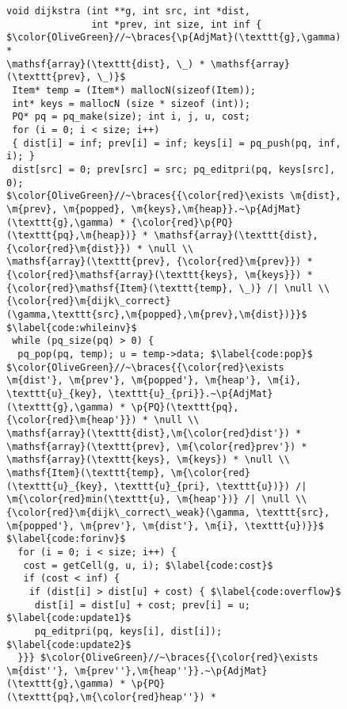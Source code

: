 
\begin{figure}[t]

\begin{lstlisting}[mathescape=true,showlines=true]
void dijkstra (int **g, int src, int *dist, 
               int *prev, int size, int inf {
$\color{OliveGreen}//~\braces{\p{AdjMat}(\texttt{g},\gamma) *
\mathsf{array}(\texttt{dist}, \_) * \mathsf{array}(\texttt{prev}, \_)}$
 Item* temp = (Item*) mallocN(sizeof(Item));
 int* keys = mallocN (size * sizeof (int));
 PQ* pq = pq_make(size); int i, j, u, cost;
 for (i = 0; i < size; i++) 
 { dist[i] = inf; prev[i] = inf; keys[i] = pq_push(pq, inf, i); }
 dist[src] = 0; prev[src] = src; pq_editpri(pq, keys[src], 0);
$\color{OliveGreen}//~\braces{{\color{red}\exists \m{dist}, \m{prev}, \m{popped}, \m{keys},\m{heap}}.~\p{AdjMat}(\texttt{g},\gamma) * {\color{red}\p{PQ}(\texttt{pq},\m{heap})} * \mathsf{array}(\texttt{dist},{\color{red}\m{dist}}) * \null \\
\mathsf{array}(\texttt{prev}, {\color{red}\m{prev}}) * 
{\color{red}\mathsf{array}(\texttt{keys}, \m{keys}}) * 
{\color{red}\mathsf{Item}(\texttt{temp}, \_)} /| \null \\
{\color{red}\m{dijk\_correct}(\gamma,\texttt{src},\m{popped},\m{prev},\m{dist})}}$ $\label{code:whileinv}$
 while (pq_size(pq) > 0) {
  pq_pop(pq, temp); u = temp->data; $\label{code:pop}$
$\color{OliveGreen}//~\braces{{\color{red}\exists \m{dist'}, \m{prev'}, \m{popped'}, \m{heap'}, \m{i}, \texttt{u}_{key}, \texttt{u}_{pri}}.~\p{AdjMat}(\texttt{g},\gamma) * \p{PQ}(\texttt{pq},{\color{red}\m{heap'}}) * \null \\
\mathsf{array}(\texttt{dist},\m{\color{red}dist'}) * 
\mathsf{array}(\texttt{prev}, \m{\color{red}prev'}) * 
\mathsf{array}(\texttt{keys}, \m{keys}) * \null \\
\mathsf{Item}(\texttt{temp}, \m{\color{red}(\texttt{u}_{key}, \texttt{u}_{pri}, \texttt{u})}) /| 
\m{\color{red}min(\texttt{u}, \m{heap'})} /| \null \\
{\color{red}\m{dijk\_correct\_weak}(\gamma, \texttt{src}, \m{popped'}, \m{prev'}, \m{dist'}, \m{i}, \texttt{u})}}$ $\label{code:forinv}$
  for (i = 0; i < size; i++) {
   cost = getCell(g, u, i); $\label{code:cost}$
   if (cost < inf) {
    if (dist[i] > dist[u] + cost) { $\label{code:overflow}$
     dist[i] = dist[u] + cost; prev[i] = u; $\label{code:update1}$ 
     pq_editpri(pq, keys[i], dist[i]); $\label{code:update2}$
  }}} $\color{OliveGreen}//~\braces{{\color{red}\exists \m{dist''}, \m{prev''},\m{heap''}}.~\p{AdjMat}(\texttt{g},\gamma) * \p{PQ}(\texttt{pq},\m{\color{red}heap''}) *

\end{lstlisting}
\end{figure}
